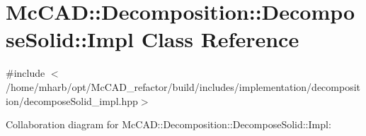 \hypertarget{classMcCAD_1_1Decomposition_1_1DecomposeSolid_1_1Impl}{}\section{Mc\+C\+AD\+:\+:Decomposition\+:\+:Decompose\+Solid\+:\+:Impl Class Reference}
\label{classMcCAD_1_1Decomposition_1_1DecomposeSolid_1_1Impl}


{\ttfamily \#include $<$/home/mharb/opt/\+Mc\+C\+A\+D\+\_\+refactor/build/includes/implementation/decomposition/decompose\+Solid\+\_\+impl.\+hpp$>$}



Collaboration diagram for Mc\+C\+AD\+:\+:Decomposition\+:\+:Decompose\+Solid\+:\+:Impl\+:
